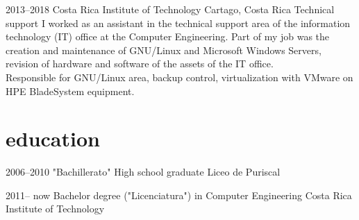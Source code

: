 \documentclass[]{friggeri-cv} %
\begin{document}
\begin{entrylist}


\entry 
{2013--2018}
{Costa Rica Institute of Technology}
{Cartago, Costa Rica}%
{Technical support}
{
I worked as an assistant in the technical support area of ​​the information technology (IT) office at the Computer Engineering. Part of my job was the creation and maintenance of GNU/Linux and Microsoft Windows Servers, revision of hardware and software of the assets of the IT office.\\
Responsible for GNU/Linux area, backup control, virtualization with VMware on HPE BladeSystem equipment.
}


%
%
%
%
%
%
%
%
%
%
%
%
%
%
%
%
%


\end{entrylist}


\section{education}

\begin{entrylist} 


\entry
{2006--2010}
{"Bachillerato" {\normalfont High school graduate}}
{Liceo de Puriscal}
{
}

\entry
{2011-- now}  
{Bachelor degree {\normalfont("Licenciatura") in Computer Engineering}}
{Costa Rica Institute of Technology}
{
}

\end{entrylist}
\end{document}
